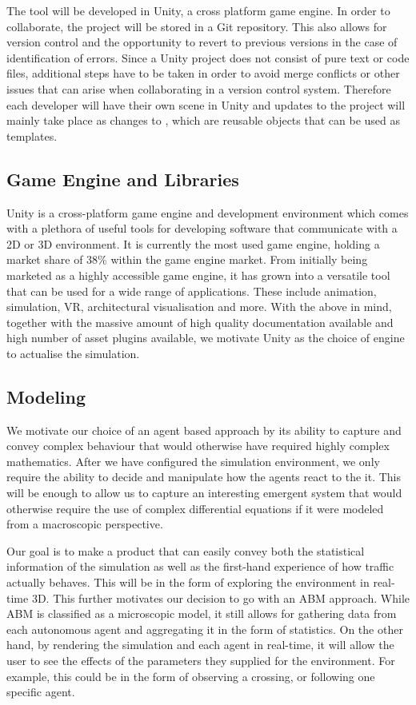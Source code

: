 The tool will be developed in Unity, a cross platform game engine. In order to collaborate, the project will be stored in a Git repository. This also allows for version control and the opportunity to revert to previous versions in the case of identification of errors. Since a Unity project does not consist of pure text or code files, additional steps have to be taken in order to avoid merge conflicts or other issues that can arise when collaborating in a version control system. Therefore each developer will have their own scene in Unity and updates to the project will mainly take place as changes to , which are reusable objects that can be used as templates.

\subsection{Game Engine and Libraries}
    Unity is a cross-platform game engine and development environment which comes with a plethora of useful tools for developing software that communicate with a 2D or 3D environment. It is currently the most used game engine, holding a market share of 38\% within the game engine market. From initially being marketed as a highly accessible game engine, it has grown into a versatile tool that can be used for a wide range of applications. These include animation, simulation, VR, architectural visualisation and more. With the above in mind, together with the massive amount of high quality documentation available and high number of asset plugins available, we motivate Unity as the choice of engine to actualise the simulation.

\subsection{Modeling}
    We motivate our choice of an agent based approach by its ability to capture and convey complex behaviour that would otherwise have required highly complex mathematics. After we have configured the simulation environment, we only require the ability to decide and manipulate how the agents react to the it. This will be enough to allow us to capture an interesting emergent system that would otherwise require the use of complex differential equations if it were modeled from a macroscopic perspective.

    Our goal is to make a product that can easily convey both the statistical information of the simulation as well as the first-hand experience of how traffic actually behaves. This will be in the form of exploring the environment in real-time 3D. This further motivates our decision to go with an ABM approach. While ABM is classified as a microscopic model, it still allows for gathering data from each autonomous agent and aggregating it in the form of statistics. On the other hand, by rendering the simulation and each agent in real-time, it will allow the user to see the effects of the parameters they supplied for the environment. For example, this could be in the form of observing a crossing, or following one specific agent.

